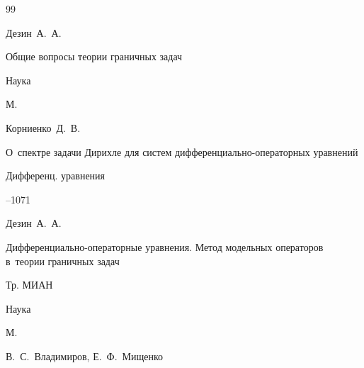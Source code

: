 \begin{thebibliography}{99}




\by Дезин~А.~А.

\book Общие вопросы теории граничных задач


\publ Наука

\publaddr М.









\by Корниенко~Д.~В.

\paper О~спектре задачи Дирихле для систем дифференциально-операторных уравнений

\jour Дифференц. уравнения




--1071

















\by Дезин~А.~А.

\book Дифференциально-операторные уравнения. Метод модельных операторов в~теории граничных задач

\serial Тр. МИАН



\publ Наука

\publaddr М.

\ed В.~С.~Владимиров, Е.~Ф.~Мищенко


\end{thebibliography}
